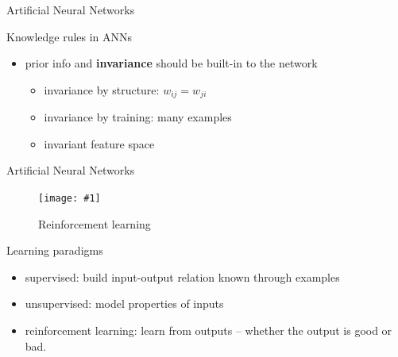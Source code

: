 \documentclass[9pt,t]{beamer}
\newcommand{\picHereWidth}[4] { %
    \begin{figure}[htp] %
        \centering
        \texttt{[image: \#1]} %
        \caption{#2} %
        \label{#3}
    \end{figure} %
}
\begin{document}
\begin{frame}{Artificial Neural Networks}
\begin{alertblock}{Knowledge rules in ANNs}
\begin{itemize}
            \item prior info and \textbf{invariance} should be built-in to the network
            \begin{itemize}
                \item invariance by structure: $w_{ij} = w_{ji}$
                \item invariance by training: many examples
                \item invariant feature space
            \end{itemize}
        \end{itemize}
    \end{alertblock}
\end{frame}

\begin{frame}{Artificial Neural Networks}
    \picHereWidth{../images/reinforce_learn.png}{Reinforcement learning}{fig:rf}{0.5\linewidth}
    \begin{alertblock}{Learning paradigms}
        \begin{itemize}
            \item supervised: build input-output relation known through examples
            \item unsupervised: model properties of inputs
            \item reinforcement learning: learn from outputs -- whether the output is good or bad.
        \end{itemize}
    \end{alertblock}
\end{frame}
\end{document}
